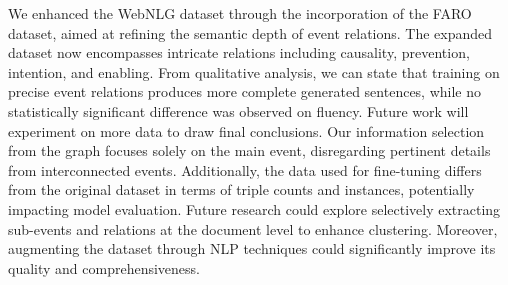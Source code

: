 \documentclass[
hf, %
]{ceurart}
\begin{document}
We enhanced the WebNLG dataset through the incorporation of the FARO dataset, aimed at refining the semantic depth of event relations. The expanded dataset now encompasses intricate relations including causality, prevention, intention, and enabling. 
From qualitative analysis, we can state that training on precise event relations produces more complete generated sentences, while no statistically significant difference was observed on fluency. Future work will experiment on more data to draw final conclusions. 
Our information selection from the graph focuses solely on the main event, disregarding pertinent details from interconnected events. Additionally, the data used for fine-tuning differs from the original dataset in terms of triple counts and instances, potentially impacting model evaluation. Future research could explore selectively extracting sub-events and relations at the document level to enhance clustering. Moreover, augmenting the dataset through NLP techniques could significantly improve its quality and comprehensiveness.
\end{document}
